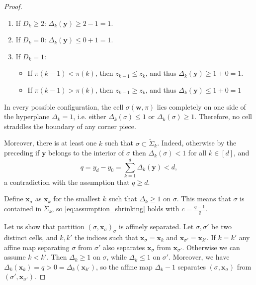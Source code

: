 \documentclass[10pt]{amsart}
\begin{document}
\begin{appendix}
\begin{proof}
\begin{enumerate}
    \item If $D_k\geq 2$: $\Delta_k(\mathbf{y})\geq 2-1=1$. 
    \item If $D_k=0$: $\Delta_k(\mathbf{y})\leq 0+1=1$.
    \item If $D_k=1$: \begin{itemize}
        \item If $\pi(k-1)<\pi(k)$, then $z_{k-1}\leq z_k$, and thus $\Delta_k(\mathbf{y})\geq 1+0=1$.
        \item If $\pi(k-1)>\pi(k)$, then $z_{k-1}\geq z_k$, and thus $\Delta_k(\mathbf{y})\leq  1+0=1$ 
    \end{itemize}
\end{enumerate}
In every possible configuration, the cell $\sigma(\mathbf{w},\pi)$ lies completely on one side of the hyperplane $\Delta_k=1$, i.e. either $\Delta_k(\sigma)\leq 1$ or $\Delta_k(\sigma)\geq 1$.  Therefore, no cell straddles the boundary of any corner piece.

Moreover, there is at least one $k$ such that $\sigma \subset \widetilde{\Sigma}_k$. Indeed, otherwise by the preceding if $\mathbf{y}$ belongs to the interior of $\sigma$ then $\Delta_k(\sigma)<1$ for all $k\in [d]$, and
\[ q= y_d-y_0 = \sum_{k=1}^d \Delta_k(\mathbf y) <d,\]
a contradiction with the assumption that $q\geq d$. 

Define $\mathbf{x}_\sigma$ as $\mathbf{x}_k$ for the smallest $k$ such that $\Delta_k \geq 1$ on $\sigma$. This means that $\sigma$ is contained in $\widetilde{\Sigma}_k$, so \eqref{eq:assumption_shrinking} holds with $c=\frac{q-1}{q}$.

Let us show that partition $(\sigma,\mathbf{x}_\sigma)_\sigma$ is affinely separated. Let $\sigma,\sigma'$ be two distinct cells, and $k,k'$ the indices such that $\mathbf{x}_\sigma= \mathbf{x}_k$ and $\mathbf{x}_{\sigma'}=\mathbf{x}_{k'}$. If $k=k'$ any affine map separating $\sigma$ from $\sigma'$ also separates $\mathbf{x}_{\sigma}$ from $\mathbf{x}_{\sigma'}$. Otherwise we can assume $k<k'$. 
Then $\Delta_k \geq 1$ on $\sigma$, while $\Delta_k \leq 1$ on $\sigma'$. Moreover, we have $\Delta_k(\mathbf{x}_k)=q > 0=\Delta_k(\mathbf{x}_{k'})$, so the affine map $\Delta_k-1$ separates $(\sigma,\mathbf{x}_\sigma)$ from $(\sigma',\mathbf{x}_{\sigma'})$. 
\end{proof}


\end{appendix}
\end{document}

